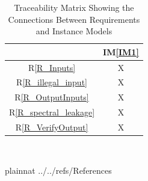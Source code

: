 \documentclass[12pt]{article}
\newcommand{\iref}[1]{IM\ref{#1}}
\newcommand{\rref}[1]{R\ref{#1}}
\begin{document}
\begin{table}[h!]
\centering
\begin{tabular}{|c|c|}
\hline
	& \iref{IM1} \\
\hline
\rref{R_Inputs}        &X \\ \hline
\rref{R_illegal_input} &X \\ \hline
\rref{R_OutputInputs}  &X  \\ \hline
\rref{R_spectral_leakage}&X \\ \hline 
\rref{R_VerifyOutput}  &X \\ 
\hline
\end{tabular}
\caption{Traceability Matrix Showing the Connections Between Requirements and Instance Models}
\label{Table:R_trace}
\end{table}




~\newpage

 {plainnat}
 {../../refs/References}
\end{document}
